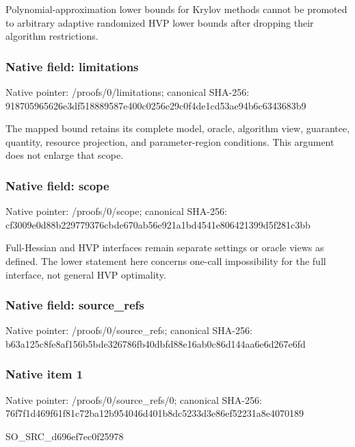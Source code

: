 \documentclass[10pt,a4paper]{article}
\begin{document}
Polynomial-approximation lower bounds for Krylov methods cannot be promoted to arbitrary adaptive randomized HVP lower bounds after dropping their algorithm restrictions.\par\endgroup

\subsubsection{Native field: limitations}
Native pointer: /proofs/0/limitations; canonical SHA-256: 918705965626e3df518889587e400c0256e29c0f4de1cd53ae94b6c6343683b9

\begingroup\raggedright\sloppy The mapped bound retains its complete model,\allowbreak{} oracle,\allowbreak{} algorithm view,\allowbreak{} guarantee,\allowbreak{} quantity,\allowbreak{} resource projection,\allowbreak{} and parameter-region conditions. This argument does not enlarge that scope.\par\endgroup

\subsubsection{Native field: scope}
Native pointer: /proofs/0/scope; canonical SHA-256: cf3009e0d88b229779376cbde670ab56e921a1bd4541e806421399d5f281c3bb

\begingroup\raggedright\sloppy Full-Hessian and HVP interfaces remain separate settings or oracle views as defined. The lower statement here concerns one-call impossibility for the full interface,\allowbreak{} not general HVP optimality.\par\endgroup

\subsubsection{Native field: source\_\allowbreak{}refs}
Native pointer: /proofs/0/source\_\allowbreak{}refs; canonical SHA-256: b63a125c8fe8af156b5bde326786fb40dbfd88e16ab0c86d144aa6e6d267e6fd

\subsubsection{Native item 1}
Native pointer: /proofs/0/source\_\allowbreak{}refs/0; canonical SHA-256: 76f7f1d469f61f81c72ba12b954046d401b8dc5233d3e86ef52231a8e4070189

\begingroup\raggedright\sloppy SO\_\allowbreak{}SRC\_\allowbreak{}d696ef7ec0f25978\par\endgroup
\end{document}
